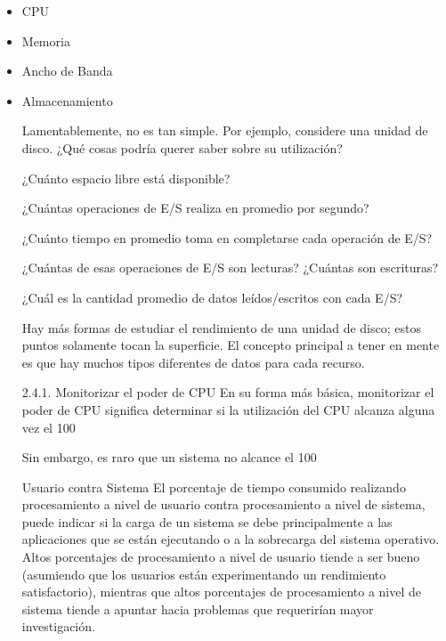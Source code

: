 \documentclass[12pt]{article}
\begin{document}
\begin{itemize}
\item CPU
\item Memoria
\item Ancho de Banda
\item Almacenamiento

Lamentablemente, no es tan simple. Por ejemplo, considere una unidad de disco. ¿Qué cosas podría querer saber sobre su utilización?

¿Cuánto espacio libre está disponible?

¿Cuántas operaciones de E/S realiza en promedio por segundo?

¿Cuánto tiempo en promedio toma en completarse cada operación de E/S?

¿Cuántas de esas operaciones de E/S son lecturas? ¿Cuántas son escrituras?

¿Cuál es la cantidad promedio de datos leídos/escritos con cada E/S?

Hay más formas de estudiar el rendimiento de una unidad de disco; estos puntos solamente tocan la superficie. El concepto principal a tener en mente es que hay muchos tipos diferentes de datos para cada recurso.



2.4.1. Monitorizar el poder de CPU
En su forma más básica, monitorizar el poder de CPU significa determinar si la utilización del CPU alcanza alguna vez el 100%

Sin embargo, es raro que un sistema no alcance el 100%

Usuario contra Sistema
El porcentaje de tiempo consumido realizando procesamiento a nivel de usuario contra procesamiento a nivel de sistema, puede indicar si la carga de un sistema se debe principalmente a las aplicaciones que se están ejecutando o a la sobrecarga del sistema operativo. Altos porcentajes de procesamiento a nivel de usuario tiende a ser bueno (asumiendo que los usuarios están experimentando un rendimiento satisfactorio), mientras que altos porcentajes de procesamiento a nivel de sistema tiende a apuntar hacia problemas que requerirían mayor investigación.


\end{itemize}
\end{document}
